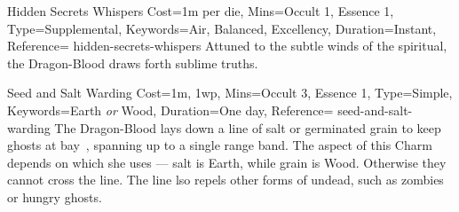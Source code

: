 

\begin{Charm}{Hidden Secrets Whispers}{%
    Cost=1m per die,
    Mins={Occult 1, Essence 1},
    Type=Supplemental,
    Keywords={Air, Balanced, Excellency},
    Duration=Instant,
    Reference=\cite*[p.~230]{db}
}{hidden-secrets-whispers}
    Attuned to the subtle winds of the spiritual, the Dragon-Blood draws forth
    sublime truths. 
\end{Charm}


\begin{Charm}{Seed and Salt Warding}{%
    Cost={1m, 1wp},
    Mins={Occult 3, Essence 1},
    Type=Simple,
    Keywords={Earth \emph{or} Wood},
    Duration=One day,
    Reference=\cite*[p.~230]{db}
}{seed-and-salt-warding}
    The Dragon-Blood lays down a line of salt or germinated grain to keep
    ghosts at bay~\parencite*[p.506]{ex3}, spanning up to a single range band.
    The aspect of this Charm depends on which she uses --- salt is Earth, while
    grain is Wood. 
    Otherwise they cannot cross the line. The line lso repels other forms of
    undead, such as zombies or hungry ghosts.
\end{Charm}



